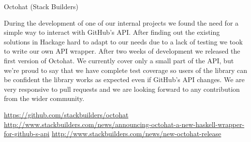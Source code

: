 \documentclass[DIV16,twocolumn,10pt]{scrreprt}
\begin{document}
\begin{hcarentry}{Octohat (Stack Builders)}
\makeheader

During the development of one of our internal projects we found the need for a simple way to interact with GitHub’s API. After finding out the existing solutions in Hackage hard to adapt to our needs due to a lack of testing we took to write our own API wrapper. After two weeks of development we released the first version of Octohat. We currently cover only a small part of the API, but we’re proud to say that we have complete test coverage so users of the library can be confident the library works as expected even if GitHub’s API changes. We are very responsive to pull requests and we are looking forward to any contribution from the wider community.


\FurtherReading
\url{https://github.com/stackbuilders/octohat} \url{http://www.stackbuilders.com/news/announcing-octohat-a-new-haskell-wrapper-for-github-s-api} \url{http://www.stackbuilders.com/news/new-octohat-release}
\end{hcarentry}
\end{document}
